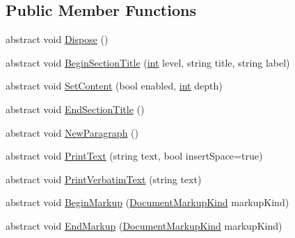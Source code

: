 \subsection*{Public Member Functions}
\begin{DoxyCompactItemize}
\item 
abstract void \hyperlink{class_software_engineering_tools_1_1_documentation_1_1_document_generator_a9fe08809c64a81d6a915169cd655cc3f}{Dispose} ()
\item 
abstract void \hyperlink{class_software_engineering_tools_1_1_documentation_1_1_document_generator_aa6b7b1a10a275fa3833f79c21ad932f8}{Begin\+Section\+Title} (\hyperlink{namespace_software_engineering_tools_1_1_documentation_a4a8017aa254d1d05b03db5132b7dd3a7afa7153f7ed1cb6c0fcf2ffb2fac21748}{int} level, string title, string label)
\item 
abstract void \hyperlink{class_software_engineering_tools_1_1_documentation_1_1_document_generator_af39f74148f77d9e036a9a3b284c4d569}{Set\+Content} (bool enabled, \hyperlink{namespace_software_engineering_tools_1_1_documentation_a4a8017aa254d1d05b03db5132b7dd3a7afa7153f7ed1cb6c0fcf2ffb2fac21748}{int} depth)
\item 
abstract void \hyperlink{class_software_engineering_tools_1_1_documentation_1_1_document_generator_a649acf880cf5cdbdf3fe71924de0954e}{End\+Section\+Title} ()
\item 
abstract void \hyperlink{class_software_engineering_tools_1_1_documentation_1_1_document_generator_a589f93438eceb47c5fae148ec40418a6}{New\+Paragraph} ()
\item 
abstract void \hyperlink{class_software_engineering_tools_1_1_documentation_1_1_document_generator_a17021c5059b0dee77f60d085567d6265}{Print\+Text} (string text, bool insert\+Space=true)
\item 
abstract void \hyperlink{class_software_engineering_tools_1_1_documentation_1_1_document_generator_a9806a5f0d5c0fea55cc7247ca6ea1d70}{Print\+Verbatim\+Text} (string text)
\item 
abstract void \hyperlink{class_software_engineering_tools_1_1_documentation_1_1_document_generator_a9398de502d89f600ac1f8ec72e6f1f48}{Begin\+Markup} (\hyperlink{namespace_software_engineering_tools_1_1_documentation_a4eed17ca0ed06a8b62b953b063f857d9}{Document\+Markup\+Kind} markup\+Kind)
\item 
abstract void \hyperlink{class_software_engineering_tools_1_1_documentation_1_1_document_generator_a11ff9fa315e40775e63fd2b4dc184596}{End\+Markup} (\hyperlink{namespace_software_engineering_tools_1_1_documentation_a4eed17ca0ed06a8b62b953b063f857d9}{Document\+Markup\+Kind} markup\+Kind)

\end{DoxyCompactItemize}
